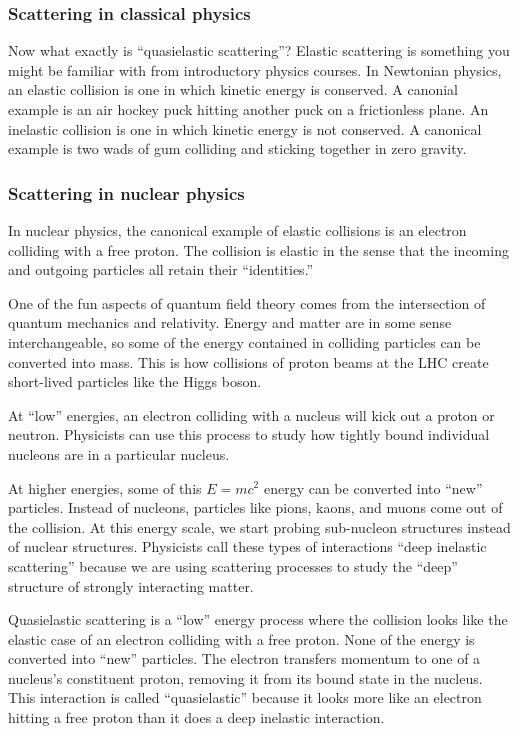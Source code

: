 \subsubsection{Scattering in classical physics}
Now what exactly is “quasielastic scattering”?
Elastic scattering is something you might be familiar with from introductory
physics courses.
In Newtonian physics, an elastic collision is one in which kinetic energy is
conserved.
A canonial example is an air hockey puck hitting another puck on a frictionless
plane.
An inelastic collision is one in which kinetic energy is not conserved.
A canonical example is two wads of gum colliding and sticking together in zero
gravity.

\subsubsection{Scattering in nuclear physics}
In nuclear physics, the canonical example of elastic collisions is an electron
colliding with a free proton.
The collision is elastic in the sense that the incoming and outgoing particles
all retain their “identities.”

One of the fun aspects of quantum field theory comes from the intersection of
quantum mechanics and relativity.
Energy and matter are in some sense interchangeable, so some of the energy
contained in colliding particles can be converted into mass.
This is how collisions of proton beams at the LHC create short-lived particles
like the Higgs boson.

At “low” energies, an electron colliding with a nucleus will kick out a proton
or neutron.
Physicists can use this process to study how tightly bound individual nucleons
are in a particular nucleus.

At higher energies, some of this $E=mc^2$ energy can be converted into “new”
particles.
Instead of nucleons, particles like pions, kaons, and muons come out of the
collision.
At this energy scale, we start probing sub-nucleon structures instead of
nuclear structures.
Physicists call these types of interactions “deep inelastic scattering” because
we are using scattering processes to study the “deep” structure of strongly
interacting matter.

Quasielastic scattering is a “low” energy process where the collision looks
like the elastic case of an electron colliding with a free proton.
None of the energy is converted into “new” particles.
The electron transfers momentum to one of a nucleus’s constituent proton,
removing it from its bound state in the nucleus.
This interaction is called “quasielastic” because it looks more like an
electron hitting a free proton than it does a deep inelastic interaction.

